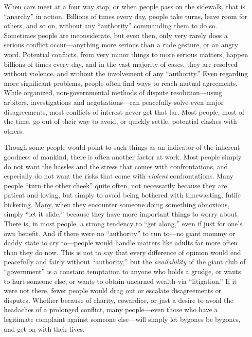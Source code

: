 \documentclass{book}
\begin{document}
When cars meet at a four way stop, or when people pass on the sidewalk, that is \enquote{anarchy} in action. Billions of times every day, people take turns, leave room for others, and so on, without any \enquote{authority} commanding them to do so. Sometimes people are inconsiderate, but even then, only very rarely does a serious conflict occur---anything more serious than a rude gesture, or an angry word. Potential conflicts, from very minor things to more serious matters, happen billions of times every day, and in the vast majority of cases, they are resolved without violence, and without the involvement of any \enquote{authority.} Even regarding more significant problems, people often find ways to reach mutual agreements. While organized, non-governmental methods of dispute resolution---using arbiters, investigations and negotiations---can peacefully solve even major disagreements, most conflicts of interest never get that far. Most people, most of the time, go out of their way to avoid, or quickly settle, potential clashes with others.

Though some people would point to such things as an indicator of the inherent goodness of mankind, there is often another factor at work. Most people simply do not want the hassles and the stress that comes with confrontations, and especially do not want the risks that come with \emph{violent} confrontations. Many people \enquote{turn the other cheek} quite often, not necessarily because they are patient and loving, but simply to avoid being bothered with timewasting, futile bickering. Many, when they encounter someone doing something obnoxious, simply \enquote{let it slide,} because they have more important things to worry about. There is, in most people, a strong tendency to \enquote{get along,} even if just for one's own benefit. And if there were no \enquote{authority} to run to---no giant mommy or daddy state to cry to---people would handle matters like adults far more often than they do now. This is not to say that every difference of opinion would end peacefully and fairly without \enquote{authority,} but the \emph{availability} of the giant club of \enquote{government} is a constant temptation to anyone who holds a grudge, or wants to hurt someone else, or wants to obtain unearned wealth via \enquote{litigation.} If it were not there, fewer people would drag out or escalate disagreements or disputes. Whether because of charity, cowardice, or just a desire to avoid the headaches of a prolonged conflict, many people---even those who have a legitimate complaint against someone else---will simply let bygones be bygones, and get on with their lives.
\end{document}
